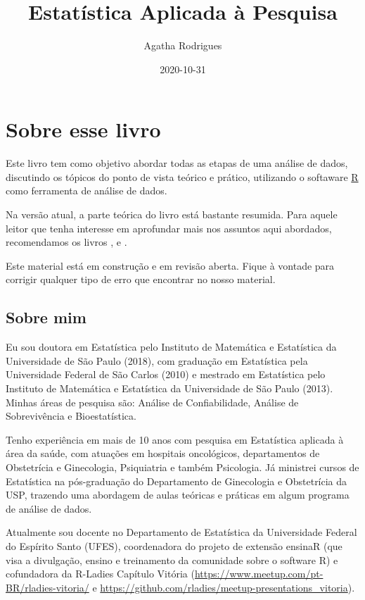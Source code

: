 \documentclass[
]{book}
\title{Estatística Aplicada à Pesquisa}
\author{Agatha Rodrigues}
\date{2020-10-31}
\begin{document}
\maketitle

{
\setcounter{tocdepth}{1}
\tableofcontents
}
\hypertarget{sobre-esse-livro}{%
\chapter{Sobre esse livro}\label{sobre-esse-livro}}

Este livro tem como objetivo abordar todas as etapas de uma análise de dados, discutindo os tópicos do ponto de vista teórico e prático, utilizando o softaware \href{https://cran.r-project.org/}{R} como ferramenta de análise de dados.

Na versão atual, a parte teórica do livro está bastante resumida. Para aquele leitor que tenha interesse em aprofundar mais nos assuntos aqui abordados, recomendamos os livros \citet{morettin2020introduccaoa}, \citet{bussab2004estatistica} e \citet{magalhaes2002noccoes}.

Este material está em construção e em revisão aberta. Fique à vontade para corrigir qualquer tipo de erro que encontrar no nosso material.

\hypertarget{sobre-mim}{%
\section{Sobre mim}\label{sobre-mim}}

Eu sou doutora em Estatística pelo Instituto de Matemática e Estatística da Universidade de São Paulo (2018), com graduação em Estatística pela Universidade Federal de São Carlos (2010) e mestrado em Estatística pelo Instituto de Matemática e Estatística da Universidade de São Paulo (2013). Minhas áreas de pesquisa são: Análise de Confiabilidade, Análise de Sobrevivência e Bioestatística.

Tenho experiência em mais de 10 anos com pesquisa em Estatística aplicada à área da saúde, com atuações em hospitais oncológicos, departamentos de Obstetrícia e Ginecologia, Psiquiatria e também Psicologia. Já ministrei cursos de Estatística na pós-graduação do Departamento de Ginecologia e Obstetrícia da USP, trazendo uma abordagem de aulas teóricas e práticas em algum programa de análise de dados.

Atualmente sou docente no Departamento de Estatística da Universidade Federal do Espírito Santo (UFES), coordenadora do projeto de extensão ensinaR (que visa a divulgação, ensino e treinamento da comunidade sobre o software R) e cofundadora da R-Ladies Capítulo Vitória (\url{https://www.meetup.com/pt-BR/rladies-vitoria/} e \url{https://github.com/rladies/meetup-presentations_vitoria}).
\end{document}
